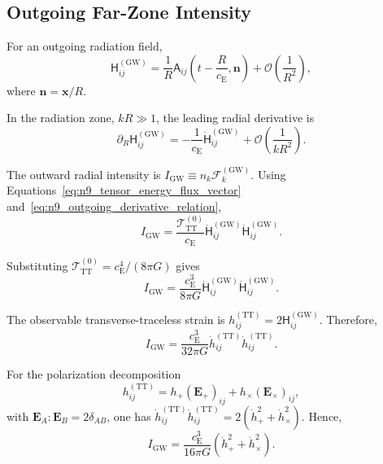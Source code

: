 \subsection{Outgoing Far-Zone Intensity}
\label{subsec:n9_far_zone_intensity}

For an outgoing radiation field,
\begin{equation}
    \mathsf{H}_{ij}^{(\mathrm{GW})} = \frac{1}{R} \mathsf{A}_{ij} \left( t-\frac{R}{c_{\mathrm{E}}}, \mathbf{n} \right) + \mathcal{O} \left( \frac{1}{R^{2}} \right),
    \label{eq:n9_outgoing_wave_form}
\end{equation}
where $\mathbf{n} = \mathbf{x}/R$.

In the radiation zone, $kR \gg 1$, the leading radial derivative is
\begin{equation}
    \partial_{R} \mathsf{H}_{ij}^{(\mathrm{GW})} = - \frac{1}{c_{\mathrm{E}}} \dot{\mathsf{H}}_{ij}^{(\mathrm{GW})} + \mathcal{O} \left( \frac{1}{kR^{2}} \right).
    \label{eq:n9_outgoing_derivative_relation}
\end{equation}

The outward radial intensity is $I_{\mathrm{GW}} \equiv n_{k} \mathcal{F}_{k}^{(\mathrm{GW})}$. Using Equations~\eqref{eq:n9_tensor_energy_flux_vector} and~\eqref{eq:n9_outgoing_derivative_relation},
\begin{equation}
    I_{\mathrm{GW}} = \frac{ \mathcal{T}_{\mathrm{TT}}^{(0)} }{ c_{\mathrm{E}} } \dot{\mathsf{H}}_{ij}^{(\mathrm{GW})} \dot{\mathsf{H}}_{ij}^{(\mathrm{GW})}.
    \label{eq:n9_intensity_H}
\end{equation}

Substituting $\mathcal{T}_{\mathrm{TT}}^{(0)} = c_{\mathrm{E}}^{4} / (8\pi G)$ gives
\begin{equation}
    I_{\mathrm{GW}} = \frac{ c_{\mathrm{E}}^{3} }{ 8\pi G } \dot{\mathsf{H}}_{ij}^{(\mathrm{GW})} \dot{\mathsf{H}}_{ij}^{(\mathrm{GW})}.
    \label{eq:n9_intensity_H_normalized}
\end{equation}

The observable transverse-traceless strain is $h_{ij}^{(\mathrm{TT})} = 2\mathsf{H}_{ij}^{(\mathrm{GW})}$. Therefore,
\begin{equation}
    I_{\mathrm{GW}} = \frac{ c_{\mathrm{E}}^{3} }{ 32\pi G } \dot{h}_{ij}^{(\mathrm{TT})} \dot{h}_{ij}^{(\mathrm{TT})}.
    \label{eq:n9_intensity_tensor_strain}
\end{equation}

For the polarization decomposition
\begin{equation}
    h_{ij}^{(\mathrm{TT})} = h_{+}(\mathbf{E}_{+})_{ij} + h_{\times}(\mathbf{E}_{\times})_{ij},
\end{equation}
with $\mathbf{E}_{A}:\mathbf{E}_{B} = 2\delta_{AB}$, one has $\dot{h}_{ij}^{(\mathrm{TT})} \dot{h}_{ij}^{(\mathrm{TT})} = 2 \left( \dot{h}_{+}^{2} + \dot{h}_{\times}^{2} \right)$. Hence,
\begin{equation}
    I_{\mathrm{GW}} = \frac{ c_{\mathrm{E}}^{3} }{ 16\pi G } \left( \dot{h}_{+}^{2} + \dot{h}_{\times}^{2} \right).
    \label{eq:n9_intensity_polarizations}
\end{equation}

